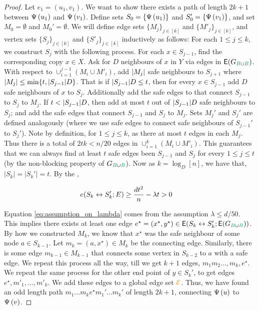 \documentclass[11pt]{article}
\begin{document}
\begin{proof}
Let $e_1 = (u_1,v_1)$. We want to show there exists a path of length $2k+1$ between $\Psi\left(u_1\right)$ and $\Psi\left(v_1\right)$.
Define sets $S_0 = \{\Psi\left(u_1\right)\}$ and $S'_0 = \{ \Psi\left(v_1\right)\}$, and set $M_0 = \emptyset$ and $M_0' = \emptyset$.
We will define edge sets $\{ M_j\}_{j \in [k]}$ and $ \{ M'_j\}_{j \in [k]}$, and vertex sets $\{ S_j\}_{j \in [k]}$ and $\{ S'_j\}_{j \in [k]}$ inductively as follows: For each $1 \leq j \leq k$, we construct $S_{j}$ with the following process.
For each $x \in S_{j-1}$, find the corresponding copy $x \in X$. Ask for $D$ neighbours of $x$ in $Y$ via edges in $\Edges{\BipartiteG}$.
With respect to $\cup_{i=1}^{j-1} (M_i \cup M'_i)$, add $|M_j|$ safe neighbours to $S_{j+1}$ where $|M_j| \le \min\{t, |S_{j-1}|D\}$.
That is if $|S_{j-1}|D \le t$, then for every $x \in S_{j-1}$ add $D$ safe neighbours of $x$ to $S_j$. Additionally add the safe edges to that connect $S_{j-1}$ to $S_j$ to $M_j$.
If $t < |S_{j-1}|D$, then add at most $t$ out of $|S_{j-1}|D$ safe neighbours to $S_j$; and add the safe edges that connect $S_{j-1}$ and $S_j$ to $M_j$.
Sets $M_j'$ and $S_j'$ are defined analogously (where we use safe edges to connect safe neighbours of $S_{j-1}'$ to $S_j'$).
Note by definition, for $1 \le j \le k$, as there at most $t$ edges in each $M_j$. Thus there is a total of $2tk < n/20$ edges in $\cup_{i=1}^{k} (M_i \cup M'_i)$.
This guarantees that we can always find at least $t$ safe edges been $ S_{j-1}$ and $S_j$ for every $1 \le j \le t$ (by the non-blocking property of $\BipartiteG$).
\flushleft
Now as $k = \log_D[n]$, we have that, $|S_k| = |S_k'|= t$.
By the ,

\begin{align}
e(S_k \leftrightarrow S_k'; E)
 &\geq \frac{d t^2}{n} - \lambda t  > 0 \label{eq:assumption_on_lambda}
\end{align}

Equation \eqref{eq:assumption_on_lambda} comes from the assumption $\lambda \leq d/50$.
This implies there exists at least one edge $e^\star=(x^\star,y^\star) \in \CutEdgesSet{S_k}{S_k'}{\Edges{\BipartiteG}}$.
By how we constructed $M_k$, we know that $x^\star$ was the safe neighbour of some node $a \in S_{k-1}$.
Let $m_k = (a,x^\star) \in M_k$ be the connecting edge.
Similarly, there is some edge $m_{k-1} \in M_{k-1}$ that connects some vertex in $S_{k-2}$ to $a$ with a safe edge.
We repeat this process all the way, till we get $k+1$ edges, $m_1 m_2 \dots, m_k, e^\star$.
We repeat the same process for the other end point of $y \in S_k'$, to get edges $e^\star, m'_1, \dots, m'_k$.
We add these edges to a global edge set $\textcolor{orange}{\mathcal{E}}$.
Thus, we have found an odd length path $m_1\dots m_k e^\star m_1'\dots m_k'$ of length $2k+1$, connecting $\Psi\left(u\right)$ to $\Psi\left(v\right)$.


\end{proof}
\end{document}
